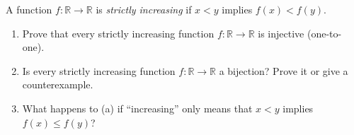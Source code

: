 A function $f:\mathbb R\to\mathbb R$ is \emph{strictly increasing} if $x<y$ implies $f(x)<f(y)$.
\begin{enumerate}
\item[(a)] Prove that every strictly increasing function $f:\mathbb R\to\mathbb R$ is injective (one-to-one).
\item[(b)] Is every strictly increasing function $f:\mathbb R\to\mathbb R$ a bijection? Prove it or give a counterexample.
\item[(c)] What happens to (a) if ``increasing'' only means that $x<y$ implies $f(x)\le f(y)$?
\end{enumerate}
